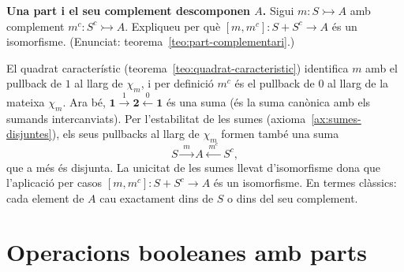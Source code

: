 \begin{exercici}
\textbf{Una part i el seu complement descomponen \(A\).} Sigui \(m:S\rightarrowtail A\) amb complement \(m^c:S^c\rightarrowtail A\). Expliqueu per què \([m,m^c]:S+S^c\to A\) és un isomorfisme. (Enunciat: teorema~\ref{teo:part-complementari}.)
\end{exercici}
\begin{solucio}
El quadrat característic (teorema~\ref{teo:quadrat-caracteristic}) identifica \(m\) amb el pullback de \(1\) al llarg de \(\chi_m\), i per definició \(m^c\) és el pullback de \(0\) al llarg de la mateixa \(\chi_m\). Ara bé, \(\mathbf1\xrightarrow{1}\mathbf2\xleftarrow{0}\mathbf1\) és una suma (és la suma canònica amb els sumands intercanviats). Per l'estabilitat de les sumes (axioma~\ref{ax:sumes-disjuntes}), els seus pullbacks al llarg de \(\chi_m\) formen també una suma
\[
S\xrightarrow{\;m\;}A\xleftarrow{\;m^c\;}S^c,
\]
que a més és disjunta. La unicitat de les sumes llevat d'isomorfisme dona que l'aplicació per casos \([m,m^c]:S+S^c\to A\) és un isomorfisme. En termes clàssics: cada element de \(A\) cau exactament dins de \(S\) o dins del seu complement.
\end{solucio}

\section{Operacions booleanes amb parts}\label{prac:booleanes}


